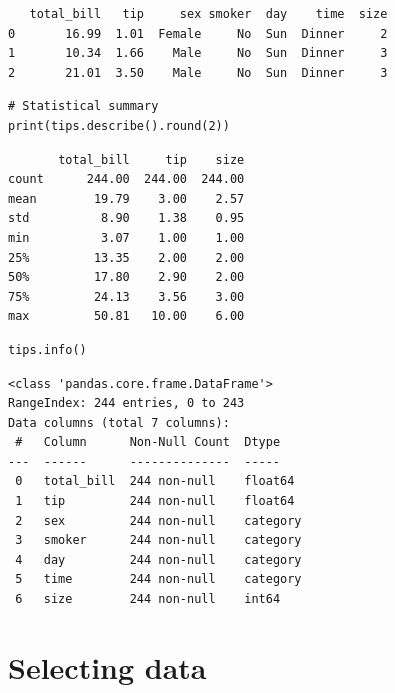 \begin{codeoutput}
\begin{verbatim}
   total_bill   tip     sex smoker  day    time  size
0       16.99  1.01  Female     No  Sun  Dinner     2
1       10.34  1.66    Male     No  Sun  Dinner     3
2       21.01  3.50    Male     No  Sun  Dinner     3
\end{verbatim}
\end{codeoutput}

\begin{codeblock}[title=\textbf{Python}]
\begin{verbatim}
# Statistical summary
print(tips.describe().round(2))
\end{verbatim}
\end{codeblock}

\begin{codeoutput}
\begin{verbatim}
       total_bill     tip    size
count      244.00  244.00  244.00
mean        19.79    3.00    2.57
std          8.90    1.38    0.95
min          3.07    1.00    1.00
25%         13.35    2.00    2.00
50%         17.80    2.90    2.00
75%         24.13    3.56    3.00
max         50.81   10.00    6.00
\end{verbatim}
\end{codeoutput}

\begin{codeblock}[title=\textbf{Python}]
\begin{verbatim}
tips.info()
\end{verbatim}
\end{codeblock}

\begin{codeoutput}
\begin{verbatim}
<class 'pandas.core.frame.DataFrame'>
RangeIndex: 244 entries, 0 to 243
Data columns (total 7 columns):
 #   Column      Non-Null Count  Dtype
---  ------      --------------  -----
 0   total_bill  244 non-null    float64
 1   tip         244 non-null    float64
 2   sex         244 non-null    category
 3   smoker      244 non-null    category
 4   day         244 non-null    category
 5   time        244 non-null    category
 6   size        244 non-null    int64
\end{verbatim}
\end{codeoutput}

\section{Selecting data}

